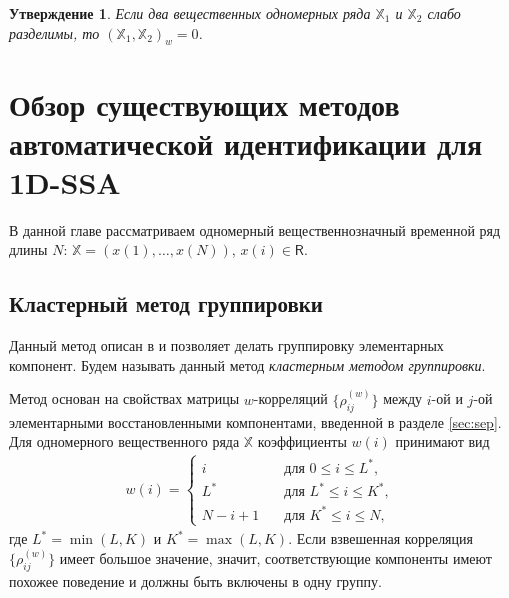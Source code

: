\documentclass[specialist,
               substylefile = spbu.rtx,
               subf,href,colorlinks=true, 12pt]{disser}
\newtheorem{Th}{Утверждение}
\begin{document}
\begin{Th} \cite[Corollary 6.2]{Golyandina.etal2001} \label{th:sep_wcor}
Если два вещественных одномерных ряда $\mathbb{X}_1$ и $\mathbb{X}_2$ слабо разделимы, то $(\mathbb{X}_1, \mathbb{X}_2)_w = 0$.
\end{Th}

\chapter{Обзор существующих методов автоматической идентификации для 1D-SSA}
\label{sec:1d_methods}
В данной главе рассматриваем одномерный вещественнозначный временной ряд длины $N$: $\mathbb{X}= (x(1),\ldots,x(N))$, $x(i) \in \mathsf{R}$.

\section{Кластерный метод группировки} \label{sec:1D_wcor}
Данный метод описан в \cite{Golyandina.Zhigljavsky2012} и позволяет делать группировку элементарных компонент. 
Будем называть данный метод \textit{кластерным методом группировки}.


Метод основан на свойствах матрицы $w$-корреляций $\{\rho^{(w)}_{ij}\}$ между $i$-ой и $j$-ой элементарными восстановленными компонентами, введенной в разделе \ref{sec:sep}. 
Для одномерного вещественного ряда $\mathbb{X}$ коэффициенты $w(i)$ принимают вид
\begin{gather} \label{eq:w_i}
 w(i) =
\begin{cases}
i &\quad \text{для } 0 \leqslant i \leqslant L^*, \\
L^* & \quad \text{для } L^* \leqslant i \leqslant K^*, \\
N - i + 1 & \quad \text{для } K^* \leqslant i \leqslant N,
\end{cases} 
\end{gather}
где $L^* = \min(L,K)$ и $K^* = \max(L,K)$.
Если взвешенная корреляция $\{\rho^{(w)}_{ij}\}$ имеет большое значение, значит, соответствующие компоненты имеют похожее поведение и должны быть включены в одну группу. 
\end{document}
